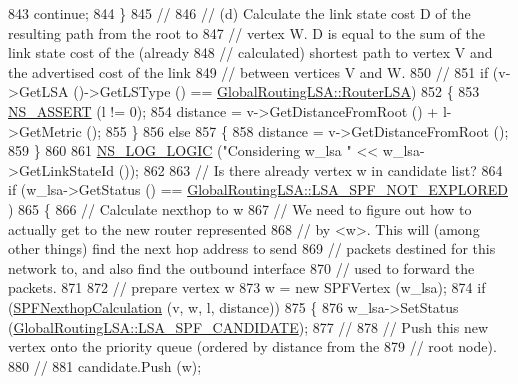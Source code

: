 \begin{DoxyCode}
843           \textcolor{keywordflow}{continue};
844         \}
845 \textcolor{comment}{//}
846 \textcolor{comment}{// (d) Calculate the link state cost D of the resulting path from the root to }
847 \textcolor{comment}{// vertex W.  D is equal to the sum of the link state cost of the (already }
848 \textcolor{comment}{// calculated) shortest path to vertex V and the advertised cost of the link}
849 \textcolor{comment}{// between vertices V and W.}
850 \textcolor{comment}{//}
851       \textcolor{keywordflow}{if} (v->GetLSA ()->GetLSType () == \hyperlink{classns3_1_1GlobalRoutingLSA_a34eb53a1ed37c877923b74d671224fdeada9e6185a392b3bb450846f5282e415d}{GlobalRoutingLSA::RouterLSA})
852         \{
853           \hyperlink{assert_8h_a6dccdb0de9b252f60088ce281c49d052}{NS\_ASSERT} (l != 0);
854           distance = v->GetDistanceFromRoot () + l->GetMetric ();
855         \}
856       \textcolor{keywordflow}{else}
857         \{
858           distance = v->GetDistanceFromRoot ();
859         \}
860 
861       \hyperlink{group__logging_ga88acd260151caf2db9c0fc84997f45ce}{NS\_LOG\_LOGIC} (\textcolor{stringliteral}{"Considering w\_lsa "} << w\_lsa->GetLinkStateId ());
862 
863 \textcolor{comment}{// Is there already vertex w in candidate list?}
864       \textcolor{keywordflow}{if} (w\_lsa->GetStatus () == \hyperlink{classns3_1_1GlobalRoutingLSA_a18bf63da580856fe1cc158aa855af1bda0d9a91161488cead75d479293fd05a94}{GlobalRoutingLSA::LSA\_SPF\_NOT\_EXPLORED}
      )
865         \{
866 \textcolor{comment}{// Calculate nexthop to w}
867 \textcolor{comment}{// We need to figure out how to actually get to the new router represented}
868 \textcolor{comment}{// by <w>.  This will (among other things) find the next hop address to send}
869 \textcolor{comment}{// packets destined for this network to, and also find the outbound interface}
870 \textcolor{comment}{// used to forward the packets.}
871 
872 \textcolor{comment}{// prepare vertex w}
873           w = \textcolor{keyword}{new} SPFVertex (w\_lsa);
874           \textcolor{keywordflow}{if} (\hyperlink{classns3_1_1GlobalRouteManagerImpl_ab082a78c423009f77c9cfe9018d40021}{SPFNexthopCalculation} (v, w, l, distance))
875             \{
876               w\_lsa->SetStatus (\hyperlink{classns3_1_1GlobalRoutingLSA_a18bf63da580856fe1cc158aa855af1bda9f23e66077c059f58318033586e74c50}{GlobalRoutingLSA::LSA\_SPF\_CANDIDATE});
877 \textcolor{comment}{//}
878 \textcolor{comment}{// Push this new vertex onto the priority queue (ordered by distance from the}
879 \textcolor{comment}{// root node).}
880 \textcolor{comment}{//}
881               candidate.Push (w);

\end{DoxyCode}
